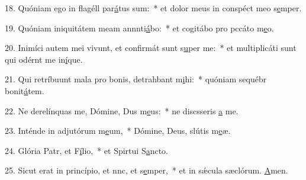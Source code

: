 18. Quóniam ego in flagéll par\uline{á}tus sum:~* et dolor meus in conspéct meo s\uline{e}mper.\par 
19. Quóniam iniquitátem meam annnti\uline{á}bo:~* et cogitábo pro pccáto m\uline{e}o.\par 
20. Inimíci autem mei vivunt, et confirmát sunt s\uline{u}per me:~* et multiplicáti sunt qui odérnt me in\uline{í}que.\par 
21. Qui retríbuunt mala pro bonis, detrahbant m\uline{i}hi:~* quóniam sequébr bonit\uline{á}tem.\par 
22. Ne derelínquas me, Dómine, Dus m\uline{e}us:~* ne discsseris \uline{a} me.\par 
23. Inténde in adjutórum m\uline{e}um,~* Dómine, Deus, slútis m\uline{e}æ.\par 
24. Glória Patr, et F\uline{í}lio,~* et Spirtui S\uline{a}ncto.\par 
25. Sicut erat in princípio, et nnc, et s\uline{e}mper,~* et in sǽcula sæclórum. \uline{A}men.\par 
